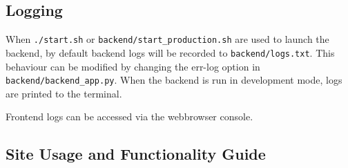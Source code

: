 \documentclass[../report.tex]{subfiles}
\begin{document}
\subsection{Logging}

When \verb|./start.sh| or \verb|backend/start_production.sh| are used to launch the backend, by default backend logs will be recorded to \verb|backend/logs.txt|.
This behaviour can be modified by changing the err-log option in \verb|backend/backend_app.py|.
When the backend is run in development mode, logs are printed to the terminal.

Frontend logs can be accessed via the webbrowser console.

\subsection{Site Usage and Functionality Guide}



\end{document}
